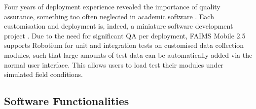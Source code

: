 \documentclass[preprint,12pt, a4paper]{elsarticle}
\begin{document}
Four years of deployment experience revealed the importance of quality assurance, something too often neglected in academic software \cite{Might2010-fo, Sun2012-ub}. Each customisation and deployment is, indeed, a miniature software development project \cite{Sobotkova2016-mx}. Due to the need for significant QA per deployment, FAIMS Mobile 2.5 supports Robotium for unit and integration tests on customised data collection modules, such that large amounts of test data can be automatically added via the normal user interface. This allows users to load test their modules under simulated field conditions. 

\subsection{Software Functionalities}
\label{}
\end{document}
